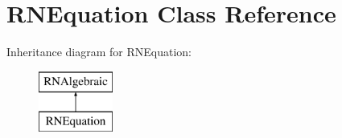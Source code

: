 \hypertarget{class_r_n_equation}{}\section{R\+N\+Equation Class Reference}
\label{class_r_n_equation}
Inheritance diagram for R\+N\+Equation\+:\begin{figure}[H]
\begin{center}
\leavevmode
\includegraphics[height=2.000000cm]{class_r_n_equation}
\end{center}
\end{figure}
